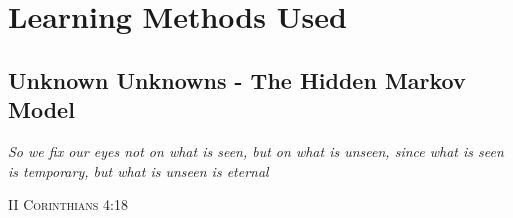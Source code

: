 
\FloatBarrier

\section{Learning Methods Used}


 
 \subsection{Unknown Unknowns - The Hidden Markov Model}

{\textit{ So we fix our eyes not on what is seen, but on what is unseen, since what is seen is temporary, but what is unseen is eternal}  \begin{flushright}\textsc{ II Corinthians 4:18}\end{flushright}}

